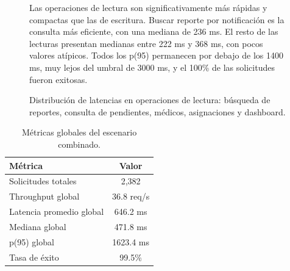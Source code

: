 \begin{figure}[H]
\begin{minipage}{0.55\textwidth}
    \end{minipage}
    \hfill
    \begin{minipage}{0.40\textwidth}
        \small
Las operaciones de lectura son significativamente más rápidas y compactas que las de escritura. Buscar reporte por notificación es la consulta más eficiente, con una mediana de 236 ms. El resto de las lecturas presentan medianas entre 222 ms y 368 ms, con pocos valores atípicos. 
Todos los p(95) permanecen por debajo de los 1400 ms, muy lejos del umbral de 3000 ms, y el 100\% de las solicitudes fueron exitosas.
    \end{minipage}
    \caption{Distribución de latencias en operaciones de lectura: búsqueda de reportes, consulta de pendientes, médicos, asignaciones y dashboard.}
    \label{fig:boxplot-query}
\end{figure}




\begin{table}[H]
\centering
\caption{Métricas globales del escenario combinado.}
\label{tab:metricas-globales}
\footnotesize
\begin{tabular}{lc}
\hline
\textbf{Métrica} & \textbf{Valor} \\
\hline
Solicitudes totales & 2,382 \\
Throughput global & 36.8 req/s \\
Latencia promedio global & 646.2 ms \\
Mediana global & 471.8 ms \\
p(95) global & 1623.4 ms \\
Tasa de éxito & 99.5\% \\
\hline
\end{tabular}
\end{table}

